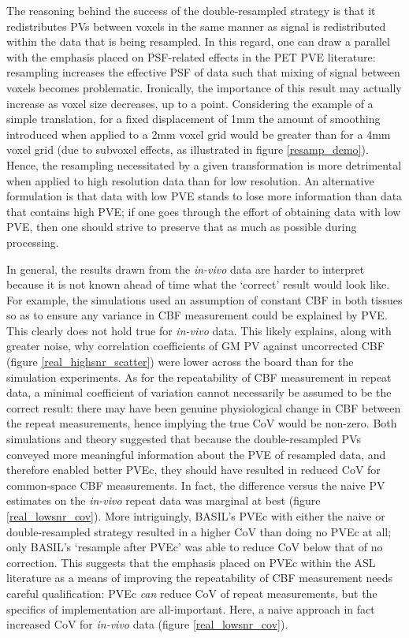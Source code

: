 The reasoning behind the success of the double-resampled strategy is that it redistributes PVs between voxels in the same manner as signal is redistributed within the data that is being resampled. In this regard, one can draw a parallel with the emphasis placed on PSF-related effects in the PET PVE literature: resampling increases the effective PSF of data such that mixing of signal between voxels becomes problematic. Ironically, the importance of this result may actually increase as voxel size decreases, up to a point. Considering the example of a simple translation, for a fixed displacement of 1mm the amount of smoothing introduced when applied to a 2mm voxel grid would be greater than for a 4mm voxel grid (due to subvoxel effects, as illustrated in figure \ref{resamp_demo}). Hence, the resampling necessitated by a given transformation is more detrimental when applied to high resolution data than for low resolution. An alternative formulation is that data with low PVE stands to lose more information than data that contains high PVE; if one goes through the effort of obtaining data with low PVE, then one should strive to preserve that as much as possible during processing. 

In general, the results drawn from the \textit{in-vivo} data are harder to interpret because it is not known ahead of time what the `correct' result would look like. For example, the simulations used an assumption of constant CBF in both tissues so as to ensure any variance in CBF measurement could be explained by PVE. This clearly does not hold true for \textit{in-vivo} data. This likely explains, along with greater noise, why correlation coefficients of GM PV against uncorrected CBF (figure \ref{real_highsnr_scatter}) were lower across the board than for the simulation experiments. As for the repeatability of CBF measurement in repeat data, a minimal coefficient of variation cannot necessarily be assumed to be the correct result: there may have been genuine physiological change in CBF between the repeat measurements, hence implying the true CoV would be non-zero. Both simulations and theory suggested that because the double-resampled PVs conveyed more meaningful information about the PVE of resampled data, and therefore enabled better PVEc, they should have resulted in reduced CoV for common-space CBF measurements. In fact, the difference versus the naive PV estimates on the \textit{in-vivo} repeat data was marginal at best (figure \ref{real_lowsnr_cov}). More intriguingly, BASIL's PVEc with either the naive or double-resampled strategy resulted in a higher CoV than doing no PVEc at all; only BASIL's `resample after PVEc' was able to reduce CoV below that of no correction. This suggests that the emphasis placed on PVEc within the ASL literature as a means of improving the repeatability of CBF measurement needs careful qualification: PVEc \textit{can} reduce CoV of repeat measurements, but the specifics of implementation are all-important. Here, a naive approach in fact increased CoV for \textit{in-vivo} data (figure \ref{real_lowsnr_cov}). 

